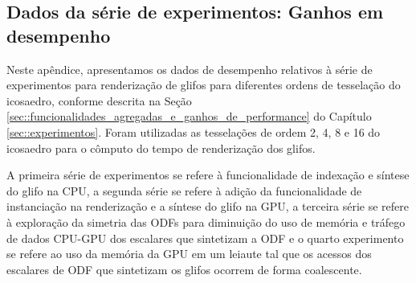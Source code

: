 \documentclass[
    12pt,                %
    oneside,            %
    a4paper,            %
    english,            %
    french,                %
    spanish,            %
    brazil                %
    ]{abntex2}
\begin{document}
\begin{apendicesenv}
\chapter{Dados da série de experimentos: Ganhos em desempenho}
\label{ap::dados_serie_experimentos_1}

Neste apêndice, apresentamos os dados de desempenho relativos à série de experimentos para renderização de glifos para diferentes ordens de tesselação do icosaedro, conforme descrita na Seção \ref{sec::funcionalidades_agregadas_e_ganhos_de_performance} do Capítulo \ref{sec::experimentos}. Foram utilizadas as tesselações de ordem 2, 4, 8 e 16 do icosaedro para o cômputo do tempo de renderização dos glifos.

A primeira série de experimentos se refere à funcionalidade de indexação e síntese do glifo na CPU, a segunda série se refere à adição da funcionalidade de instanciação na renderização e a síntese do glifo na GPU, a terceira série se refere à exploração da simetria das ODFs para diminuição do uso de memória e tráfego de dados CPU-GPU dos escalares que sintetizam a ODF e o quarto experimento se refere ao uso da memória da GPU em um leiaute tal que os acessos dos escalares de ODF que sintetizam os glifos ocorrem de forma coalescente.


\end{apendicesenv}
\end{document}
